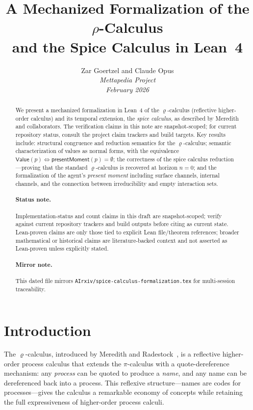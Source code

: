 \documentclass[11pt,a4paper]{article}
\title{%
  \textbf{A Mechanized Formalization of the $\rho$-Calculus\\
  and the Spice Calculus in Lean~4}
}
\author{%
  Zar Goertzel and Claude Opus \\
  {\small \textit{Mettapedia Project}} \\
  {\small \textit{February 2026}}
}
\date{}
\theoremstyle{definition}
\theoremstyle{remark}
\renewcommand{\rho}{\varrho}
\begin{document}
\maketitle

\begin{abstract}
We present a mechanized formalization in Lean~4 of the $\rho$-calculus (reflective
higher-order calculus) and its temporal extension, the \emph{spice calculus}, as
described by Meredith and collaborators.
The verification claims in this note are snapshot-scoped; for current repository
status, consult the project claim trackers and build targets.
Key results include:
structural congruence and reduction semantics for the $\rho$-calculus;
semantic characterization of values as normal forms, with the equivalence
$\mathsf{Value}(p) \iff \mathsf{presentMoment}(p) = \emptyset$;
the correctness of the spice calculus reduction---proving that the standard
$\rho$-calculus is recovered at horizon $n = 0$;
and the formalization of the agent's \emph{present moment} including surface
channels, internal channels, and the connection between irreducibility
and empty interaction sets.
\paragraph{Status note.} Implementation-status and count claims in this draft are snapshot-scoped; verify against current repository trackers and build outputs before citing as current state. Lean-proven claims are only those tied to explicit Lean file/theorem references; broader mathematical or historical claims are literature-backed context and not asserted as Lean-proven unless explicitly stated.
\paragraph{Mirror note.} This dated file mirrors \texttt{AIrxiv/spice-calculus-formalization.tex} for multi-session traceability.
\end{abstract}

\section{Introduction}
\label{sec:intro}

The $\rho$-calculus, introduced by Meredith and Radestock~\cite{meredith2005},
is a reflective higher-order process calculus that extends the $\pi$-calculus
with a quote-dereference mechanism: any \emph{process} can be quoted to produce
a \emph{name}, and any name can be dereferenced back into a process. This
reflexive structure---names are codes for processes---gives the calculus a
remarkable economy of concepts while retaining the full expressiveness of
higher-order process calculi.
\end{document}
